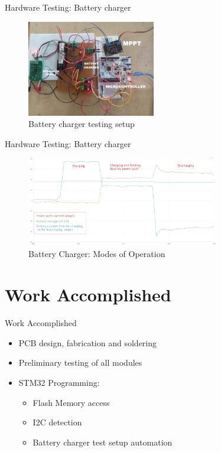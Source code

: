 \documentclass[aspectratio=169]{beamer}
\begin{document}
    \begin{frame}{Hardware Testing: Battery charger}
        \begin{figure}[h]
				\centering
				\includegraphics[width=0.5\textwidth]{diag/Bat_cha_test.jpg}
				\caption{Battery charger testing setup}
				\label{fig:mesh1}
			\end{figure}
		
	\end{frame}

    \begin{frame}{Hardware Testing: Battery charger}
	\begin{figure}[h]
		\centering
		\includegraphics[width=0.75\textwidth]{diag/Bat_cha_opmodes.png}
		\caption{Battery Charger: Modes of Operation}
		\label{fig:mesh1}
	\end{figure}
	
\end{frame}




\section{Work Accomplished}
						\begin{frame}{Work Accomplished}
		\begin{itemize}
			\item  PCB design, fabrication and soldering
			\item Preliminary testing of all modules
			\item STM32 Programming:
			\begin{itemize}
				\item Flash Memory access
				\item I2C detection
				\item Battery charger test setup automation
				
				
			\end{itemize}
		\end{itemize}
	\end{frame}
	
\end{document}
